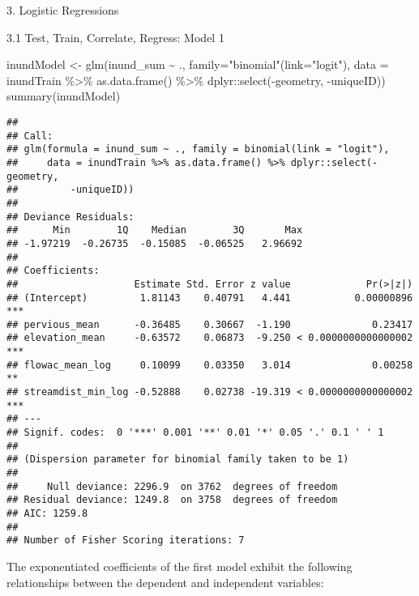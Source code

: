 \documentclass[
  ignorenonframetext,
]{beamer}
\newenvironment{Shaded}{\begin{snugshade}}{\end{snugshade}}
\newcommand{\AttributeTok}[1]{\textcolor[rgb]{0.77,0.63,0.00}{#1}}
\newcommand{\FunctionTok}[1]{\textcolor[rgb]{0.00,0.00,0.00}{#1}}
\newcommand{\NormalTok}[1]{#1}
\newcommand{\OtherTok}[1]{\textcolor[rgb]{0.56,0.35,0.01}{#1}}
\newcommand{\SpecialCharTok}[1]{\textcolor[rgb]{0.00,0.00,0.00}{#1}}
\newcommand{\StringTok}[1]{\textcolor[rgb]{0.31,0.60,0.02}{#1}}
\begin{document}
\begin{frame}[fragile]{3. Logistic Regressions}
\begin{block}{3.1 Test, Train, Correlate, Regress: Model 1}
\begin{Shaded}
\begin{Highlighting}[]
\NormalTok{inundModel }\OtherTok{\textless{}{-}} \FunctionTok{glm}\NormalTok{(inund\_sum }\SpecialCharTok{\textasciitilde{}}\NormalTok{ ., }
                    \AttributeTok{family=}\StringTok{"binomial"}\NormalTok{(}\AttributeTok{link=}\StringTok{"logit"}\NormalTok{), }\AttributeTok{data =}\NormalTok{ inundTrain }\SpecialCharTok{\%\textgreater{}\%}
                                                            \FunctionTok{as.data.frame}\NormalTok{() }\SpecialCharTok{\%\textgreater{}\%}
\NormalTok{                                                            dplyr}\SpecialCharTok{::}\FunctionTok{select}\NormalTok{(}\SpecialCharTok{{-}}\NormalTok{geometry, }\SpecialCharTok{{-}}\NormalTok{uniqueID))}
\FunctionTok{summary}\NormalTok{(inundModel)}
\end{Highlighting}
\end{Shaded}

\begin{verbatim}
## 
## Call:
## glm(formula = inund_sum ~ ., family = binomial(link = "logit"), 
##     data = inundTrain %>% as.data.frame() %>% dplyr::select(-geometry, 
##         -uniqueID))
## 
## Deviance Residuals: 
##      Min        1Q    Median        3Q       Max  
## -1.97219  -0.26735  -0.15085  -0.06525   2.96692  
## 
## Coefficients:
##                    Estimate Std. Error z value             Pr(>|z|)    
## (Intercept)         1.81143    0.40791   4.441           0.00000896 ***
## pervious_mean      -0.36485    0.30667  -1.190              0.23417    
## elevation_mean     -0.63572    0.06873  -9.250 < 0.0000000000000002 ***
## flowac_mean_log     0.10099    0.03350   3.014              0.00258 ** 
## streamdist_min_log -0.52888    0.02738 -19.319 < 0.0000000000000002 ***
## ---
## Signif. codes:  0 '***' 0.001 '**' 0.01 '*' 0.05 '.' 0.1 ' ' 1
## 
## (Dispersion parameter for binomial family taken to be 1)
## 
##     Null deviance: 2296.9  on 3762  degrees of freedom
## Residual deviance: 1249.8  on 3758  degrees of freedom
## AIC: 1259.8
## 
## Number of Fisher Scoring iterations: 7
\end{verbatim}

The exponentiated coefficients of the first model exhibit the following
relationships between the dependent and independent variables:


\end{block}
\end{frame}
\end{document}
